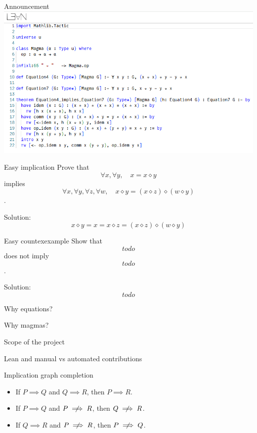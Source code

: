 \documentclass{beamer}
\newcommand{\op}{\diamond}
\begin{document}
\begin{frame}{Announcement}
\includegraphics[width=\textwidth]{initial_lean.png}
\end{frame}


\begin{frame}{Easy implication}
Prove that
$$ \forall x, \forall y,\quad x = x \op y $$
implies
$$ \forall x, \forall y, \forall z, \forall w,\quad x \op y = (x  \op z)  \op (w \op y) $$
.

\pause
Solution:
$$ x \op y = x = x \op z = (x \op z) \op (w \op y) $$
\end{frame}


\begin{frame}{Easy countexexample}
Show that
$$ todo $$
does not imply
$$ todo $$
.

\pause
Solution:
$$ todo $$
\end{frame}


\begin{frame}{Why equations?}
\end{frame}


\begin{frame}{Why magmas?}
\end{frame}


\begin{frame}{Scope of the project}
\end{frame}


\begin{frame}{Lean and manual vs automated contributions}
\end{frame}


\begin{frame}{Implication graph completion}
\begin{itemize}
	\item If $P \implies Q$ and $Q \implies R$, then $P \implies R$.
	\item If $P \implies Q$ and $P \centernot\implies R$, then $Q \centernot\implies R$.
	\item If $Q \implies R$ and $P \centernot\implies R$, then $P \centernot\implies Q$.
\end{itemize}
\end{frame}
\end{document}
